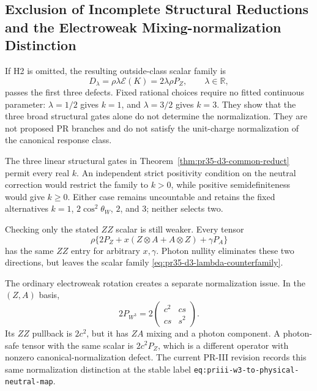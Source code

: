 \subsection{Exclusion of Incomplete Structural Reductions and the Electroweak Mixing-normalization Distinction}

If H2 is omitted, the resulting outside-class scalar family is
\begin{equation}
 D_\lambda=\rho\lambda\mathcal E(K)=2\lambda\rho P_Z,
 \qquad \lambda\in\mathbb R,
 \label{eq:pr35-d3-lambda-counterfamily}
\end{equation}
passes the first three defects.  Fixed rational choices require no fitted continuous parameter: $\lambda=1/2$ gives $k=1$, and $\lambda=3/2$ gives $k=3$.  They show that the three broad structural gates alone do not determine the normalization.  They are not proposed PR branches and do not satisfy the unit-charge normalization of the canonical response class.

The three linear structural gates in Theorem~\ref{thm:pr35-d3-common-reduct} permit every real $k$.  An independent strict positivity condition on the neutral correction would restrict the family to $k>0$, while positive semidefiniteness would give $k\geq0$.  Either case remains uncountable and retains the fixed alternatives $k=1$, $2\cos^2\theta_W$, $2$, and $3$; neither selects two.

Checking only the stated $ZZ$ scalar is still weaker.  Every tensor
\begin{equation}
 \rho\{2P_Z+x(Z\otimes A+A\otimes Z)+\gamma P_A\}
\end{equation}
has the same $ZZ$ entry for arbitrary $x,\gamma$.  Photon nullity eliminates these two directions, but leaves the scalar family
\eqref{eq:pr35-d3-lambda-counterfamily}.

The ordinary electroweak rotation creates a separate normalization issue.  In the $(Z,A)$ basis,
\begin{equation}
 2P_{W^3}=2\begin{pmatrix}c^2&cs\\cs&s^2\end{pmatrix}.
 \label{eq:pr35-d3-literal-w3-embedding}
\end{equation}
Its $ZZ$ pullback is $2c^2$, but it has $ZA$ mixing and a photon component. A photon-safe tensor with the same scalar is $2c^2P_Z$, which is a different operator with nonzero canonical-normalization defect.  The current PR-III revision records this same normalization distinction at the stable label
\texttt{eq:priii-w3-to-physical-neutral-map}.

